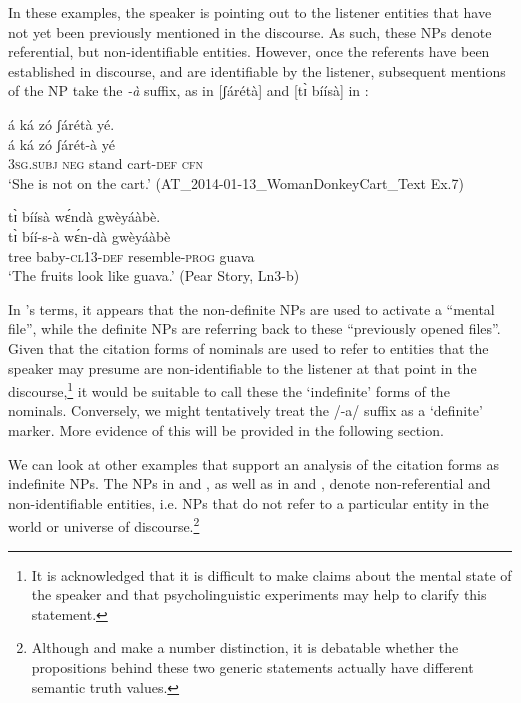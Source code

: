 \documentclass[output=paper]{langsci/langscibook}
\begin{document}

In these examples, the speaker is pointing out to the listener entities that have not yet been previously mentioned in the discourse. As such, these NPs denote referential, but non-identifiable entities. However, once the referents have been established in discourse, and are identifiable by the listener, subsequent mentions of the NP take the \textit{-à} suffix, as in [ʃárétà]  and [t\`ɪ bíísà] in :

\ea\label{ex:teo:30}
\glll á ká zó ʃárétà yé.\\
 á ká zó ʃárét-à yé\\
 3\textsc{sg}\textsc{.subj} \textsc{neg} stand cart-\textsc{def}{\rmfnm}  \textsc{cfn}\\
\glt ‘She is not on the cart.’ (AT\_2014-01-13\_WomanDonkeyCart\_Text Ex.7)
\z
{}

\ea\label{ex:teo:31}
\glll t\`ɪ bíísà w\'ɛndà gwèyáàbè.\\
 t\`ɪ bíí-s-à w\'ɛn-dà gwèyáàbè\\
 tree baby-\textsc{cl13-}\textsc{def} resemble-\textsc{prog} guava\\
\glt ‘The fruits look like guava.’ (Pear Story, Ln3-b)
\z

In \cite{DuBois1980}’s terms, it appears that the non-definite NPs are used to activate a “mental file”, while the definite NPs are referring back to these “previously opened files”. Given that the citation forms of nominals are used to refer to entities that the speaker may presume are non-identifiable to the listener at that point in the discourse,\footnote{It is acknowledged that it is difficult to make claims about the mental state of the speaker and that psycholinguistic experiments may help to clarify this statement.} it would be suitable to call these the ‘indefinite’ forms of the nominals. Conversely, we might tentatively treat the /-a/ suffix as a ‘definite’ marker. More evidence of this will be provided in the following section.

We can look at other examples that support an analysis of the citation forms as indefinite NPs. The NPs in  and , as well as in  and , denote non-referential and non-identifiable entities, i.e. NPs that do not refer to a particular entity in the world or universe of discourse.\footnote{Although  and  make a number distinction, it is debatable whether the propositions behind these two generic statements actually have different semantic truth values.}
\end{document}

